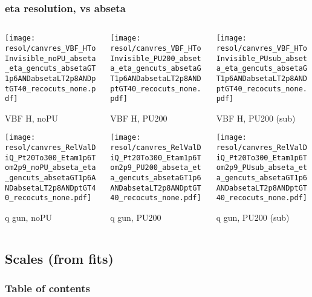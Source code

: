 \documentclass[8pt]{beamer}
\begin{document}
  \begin{frame}
  \frametitle{eta resolution, vs abseta}
  
  \begin{columns}
   \begin{column}{0.35\textwidth}
     \texttt{[image: resol/canvres\_VBF\_HToInvisible\_noPU\_abseta\_eta\_gencuts\_absetaGT1p6ANDabsetaLT2p8ANDptGT40\_recocuts\_none.pdf]}
     
     VBF H, noPU
    
     \texttt{[image: resol/canvres\_RelValDiQ\_Pt20To300\_Etam1p6Tom2p9\_noPU\_abseta\_eta\_gencuts\_absetaGT1p6ANDabsetaLT2p8ANDptGT40\_recocuts\_none.pdf]}
     
     q gun, noPU
   \end{column}
   \begin{column}{0.35\textwidth}
     \texttt{[image: resol/canvres\_VBF\_HToInvisible\_PU200\_abseta\_eta\_gencuts\_absetaGT1p6ANDabsetaLT2p8ANDptGT40\_recocuts\_none.pdf]}
     
     VBF H, PU200
    
     \texttt{[image: resol/canvres\_RelValDiQ\_Pt20To300\_Etam1p6Tom2p9\_PU200\_abseta\_eta\_gencuts\_absetaGT1p6ANDabsetaLT2p8ANDptGT40\_recocuts\_none.pdf]}
     
     q gun, PU200
   \end{column}
   \begin{column}{0.35\textwidth}
     \texttt{[image: resol/canvres\_VBF\_HToInvisible\_PUsub\_abseta\_eta\_gencuts\_absetaGT1p6ANDabsetaLT2p8ANDptGT40\_recocuts\_none.pdf]}
     
     VBF H, PU200 (sub)
    
     \texttt{[image: resol/canvres\_RelValDiQ\_Pt20To300\_Etam1p6Tom2p9\_PUsub\_abseta\_eta\_gencuts\_absetaGT1p6ANDabsetaLT2p8ANDptGT40\_recocuts\_none.pdf]}
     
     q gun, PU200 (sub)
   \end{column}
  \end{columns}
 \end{frame}

 \subsection{Scales (from fits)}

\begin{frame}
 \frametitle{Table of contents}
 
\end{frame}
\end{document}

